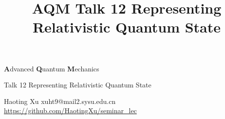 \documentclass[CJK]{beamer}
\title{AQM Talk 12 Representing Relativistic Quantum State}
\author{}
\date{}
\begin{document}
\begin{frame}
 
\begin{center}
\begin{Large}
  \bch
{\bf A}dvanced {\bf Q}uantum {\bf M}echanics

{\vskip 0.1in}

Talk 12 Representing Relativistic Quantum State
\ech
\end{Large}
\end{center}


\vskip 0.1in
\begin{center}
Haoting Xu
\vskip 0.1in
xuht9@mail2.sysu.edu.cn
\vskip 0.1in
{\tiny \url{https://github.com/HaotingXu/seminar_lec} }\\
\end{center}


\end{frame}
\end{document}

